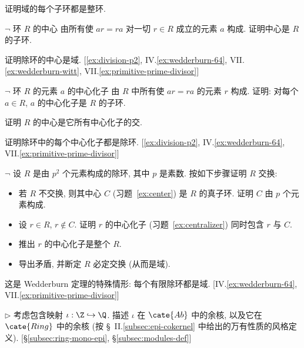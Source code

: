 \begin{prob}
\label{ex:subring-domain}
证明域的每个子环都是整环.
\end{prob}

\begin{prob}
\label{ex:center}
$\neg$ 环 $R$ 的中心%
由所有使 $ar = ra$ 对一切 $r \in R$ 成立的元素 $a$ 构成. 证明中心是 $R$ 的子环.

证明除环的中心是域. [\ref{ex:division-p2}, IV.\ref{ex:wedderburn-64}, VII.\ref{ex:wedderburn-witt}, VII.\ref{ex:primitive-prime-divisor}]
\end{prob}

\begin{prob}
\label{ex:centralizer}
$\neg$ 环 $R$ 的元素 $a$ 的中心化子%
由 $R$ 中所有使 $ar = ra$ 的元素 $r$ 构成. 证明: 对每个 $a \in R$, $a$ 的中心化子是 $R$ 的子环.

证明 $R$ 的中心是它所有中心化子的交.

证明除环中的每个中心化子都是除环. [\ref{ex:division-p2}, IV.\ref{ex:wedderburn-64}, VII.\ref{ex:primitive-prime-divisor}]
\end{prob}

\begin{prob}
\label{ex:division-p2}
$\neg$ 设 $R$ 是由 $p^2$ 个元素构成的除环, 其中 $p$ 是素数. 按如下步骤证明 $R$ 交换:
\begin{itemize}
	\item 若 $R$ 不交换, 则其中心 $C$ (习题~\ref{ex:center}) 是 $R$ 的真子环. 证明 $C$ 由 $p$ 个元素构成.
	\item 设 $r \in R$, $r \notin C$. 证明 $r$ 的中心化子 (习题~\ref{ex:centralizer}) 同时包含 $r$ 与 $C$.
	\item 推出 $r$ 的中心化子是整个 $R$.
	\item 导出矛盾, 并断定 $R$ 必定交换 (从而是域).
\end{itemize}
这是 Wedderburn 定理的特殊情形: 每个有限除环都是域. [IV.\ref{ex:wedderburn-64}, VII.\ref{ex:primitive-prime-divisor}]
\end{prob}

\begin{prob}
\label{ex:coker-iota}
$\triangleright$ 考虑包含映射 $\iota : \Z \hookrightarrow \Q$. 描述 $\iota$ 在 $\cate{Ab}$ 中的余核, 以及它在 $\cate{Ring}$ 中的余核 (按 \S~II.\ref{subsec:epi-cokernel} 中给出的万有性质的风格定义). [\S\ref{subsec:ring-mono-epi}, \S\ref{subsec:modules-def}]
\end{prob}

